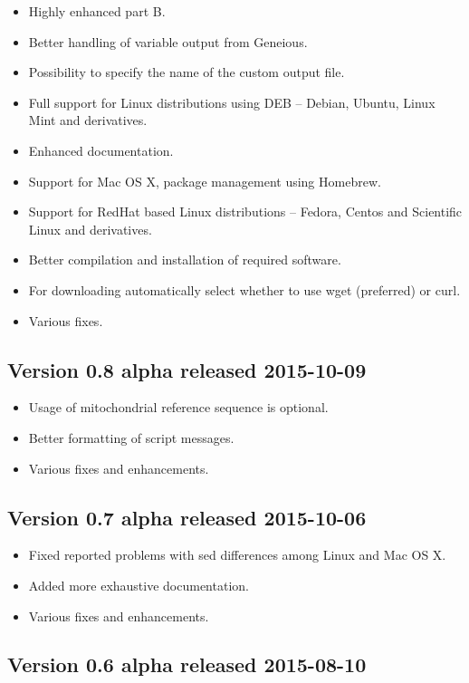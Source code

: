\documentclass[a4paper, 11pt, twoside]{article}
\begin{document}
\begin{itemize}
  \item Highly enhanced part B.
  \item Better handling of variable output from Geneious.
  \item Possibility to specify the name of the custom output file.
  \item Full support for Linux distributions using DEB -- Debian, Ubuntu, Linux Mint and derivatives.
  \item Enhanced documentation.
  \item Support for Mac OS X, package management using Homebrew.
  \item Support for RedHat based Linux distributions -- Fedora, Centos and Scientific Linux and derivatives.
  \item Better compilation and installation of required software.
  \item For downloading automatically select whether to use wget (preferred) or curl.
  \item Various fixes.
\end{itemize}

\subsection{Version 0.8 alpha released 2015-10-09}

\begin{itemize}
  \item Usage of mitochondrial reference sequence is optional.
  \item Better formatting of script messages.
  \item Various fixes and enhancements.
\end{itemize}

\subsection{Version 0.7 alpha released 2015-10-06}

\begin{itemize}
  \item Fixed reported problems with sed differences among Linux and Mac OS X.
  \item Added more exhaustive documentation.
  \item Various fixes and enhancements.
\end{itemize}

\subsection{Version 0.6 alpha released 2015-08-10}
\end{document}
